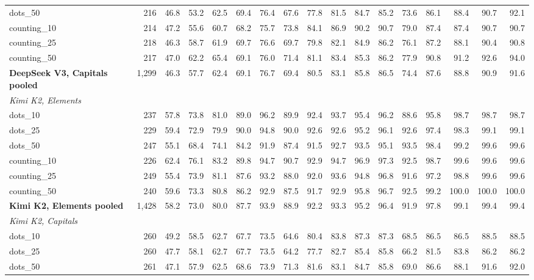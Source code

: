 \begin{table}[h]
\begin{tabular}{l r r r r r r r r r r r r r r r r}
dots\_50 & 216 & 46.8 & 53.2 & 62.5 & 69.4 & 76.4 & 67.6 & 77.8 & 81.5 & 84.7 & 85.2 & 73.6 & 86.1 & 88.4 & 90.7 & 92.1 \\
counting\_10 & 214 & 47.2 & 55.6 & 60.7 & 68.2 & 75.7 & 73.8 & 84.1 & 86.9 & 90.2 & 90.7 & 79.0 & 87.4 & 87.4 & 90.7 & 90.7 \\
counting\_25 & 218 & 46.3 & 58.7 & 61.9 & 69.7 & 76.6 & 69.7 & 79.8 & 82.1 & 84.9 & 86.2 & 76.1 & 87.2 & 88.1 & 90.4 & 90.8 \\
counting\_50 & 217 & 47.0 & 62.2 & 65.4 & 69.1 & 76.0 & 71.4 & 81.1 & 83.4 & 85.3 & 86.2 & 77.9 & 90.8 & 91.2 & 92.6 & 94.0 \\
\addlinespace[2pt]
\textbf{DeepSeek V3, Capitals pooled} & 1,299 & 46.3 & 57.7 & 62.4 & 69.1 & 76.7 & 69.4 & 80.5 & 83.1 & 85.8 & 86.5 & 74.4 & 87.6 & 88.8 & 90.9 & 91.6 \\
\multicolumn{17}{l}{\textit{Kimi K2, Elements}} \\
dots\_10 & 237 & 57.8 & 73.8 & 81.0 & 89.0 & 96.2 & 89.9 & 92.4 & 93.7 & 95.4 & 96.2 & 88.6 & 95.8 & 98.7 & 98.7 & 98.7 \\
dots\_25 & 229 & 59.4 & 72.9 & 79.9 & 90.0 & 94.8 & 90.0 & 92.6 & 92.6 & 95.2 & 96.1 & 92.6 & 97.4 & 98.3 & 99.1 & 99.1 \\
dots\_50 & 247 & 55.1 & 68.4 & 74.1 & 84.2 & 91.9 & 87.4 & 91.5 & 92.7 & 93.5 & 95.1 & 93.5 & 98.4 & 99.2 & 99.6 & 99.6 \\
counting\_10 & 226 & 62.4 & 76.1 & 83.2 & 89.8 & 94.7 & 90.7 & 92.9 & 94.7 & 96.9 & 97.3 & 92.5 & 98.7 & 99.6 & 99.6 & 99.6 \\
counting\_25 & 249 & 55.4 & 73.9 & 81.1 & 87.6 & 93.2 & 88.0 & 92.0 & 93.6 & 94.8 & 96.8 & 91.6 & 97.2 & 98.8 & 99.6 & 99.6 \\
counting\_50 & 240 & 59.6 & 73.3 & 80.8 & 86.2 & 92.9 & 87.5 & 91.7 & 92.9 & 95.8 & 96.7 & 92.5 & 99.2 & 100.0 & 100.0 & 100.0 \\
\addlinespace[2pt]
\textbf{Kimi K2, Elements pooled} & 1,428 & 58.2 & 73.0 & 80.0 & 87.7 & 93.9 & 88.9 & 92.2 & 93.3 & 95.2 & 96.4 & 91.9 & 97.8 & 99.1 & 99.4 & 99.4 \\
\multicolumn{17}{l}{\textit{Kimi K2, Capitals}} \\
dots\_10 & 260 & 49.2 & 58.5 & 62.7 & 67.7 & 73.5 & 64.6 & 80.4 & 83.8 & 87.3 & 87.3 & 68.5 & 86.5 & 86.5 & 88.5 & 88.5 \\
dots\_25 & 260 & 47.7 & 58.1 & 62.7 & 67.7 & 73.5 & 64.2 & 77.7 & 82.7 & 85.4 & 85.8 & 66.2 & 81.5 & 83.8 & 86.2 & 86.2 \\
dots\_50 & 261 & 47.1 & 57.9 & 62.5 & 68.6 & 73.9 & 71.3 & 81.6 & 83.1 & 84.7 & 85.8 & 69.0 & 86.6 & 88.1 & 91.6 & 92.0 \\

\end{tabular}
\end{table}
